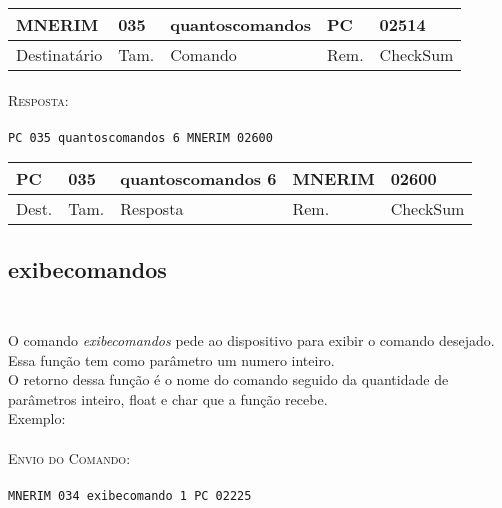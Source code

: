 \documentclass[11pt,	 papera4]{article}
\begin{document}
\begin{table}[h]
	\centering
	\begin{tabular}{p{2cm}p{1cm}p{3cm}p{1cm}p{2cm}}
		\toprule
		MNERIM & 035 & quantoscomandos & PC & 02514 \\
		\midrule	
		Destinatário & Tam. & Comando & Rem. &CheckSum \\
		\bottomrule
	\end{tabular}
	\label{tab:formatoslatex} %
\end{table}
\paragraph*{\newline\newline}
\hspace*{0.8cm}\textsc{Resposta:} \\\\ \hspace*{2cm}\texttt{PC 035 quantoscomandos 6 MNERIM 02600
} 

\begin{table}[h]
	\centering
	\begin{tabular}{p{1cm}p{1cm}p{3cm}p{2cm}p{2cm}}
		\toprule
		PC & 035 & quantoscomandos 6  & MNERIM & 02600 \\
		\midrule	
		Dest. & Tam. & Resposta & Rem. & CheckSum \\
		\bottomrule
	\end{tabular}
	\label{tab:formatoslatex} %
\end{table}

\newpage
\subsection*{exibecomandos \\\\}
O comando \textit{exibecomandos} pede ao dispositivo para exibir o comando desejado. 
Essa função tem como parâmetro um numero inteiro.\\ O retorno dessa função é o nome do comando seguido da quantidade de parâmetros inteiro, float e char que a função recebe.\\
\newline
Exemplo:\\\\ \hspace*{0.5cm} 
\textsc{Envio do Comando:} \\\\ \hspace*{2cm} \texttt{MNERIM 034 exibecomando 1 PC 02225} \\
\end{document}

